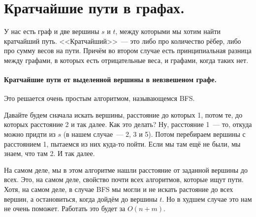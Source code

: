 \documentclass{article}
\begin{document}
    \section{Кратчайшие пути в графах.}
    У нас есть граф и две вершины $s$ и $t$, между которыми мы хотим найти кратчайший путь. <<Кратчайший>>~--- это либо про количество рёбер, либо про сумму весов на пути. Причём во втором случае есть принципиальная разница между графами, в которых есть отрицательные веса, и графами, когда таких нет.
    \paragraph{Кратчайшие пути от выделенной вершины в невзвешеном графе.}
    Это решается очень простым алгоритмом, называющемся BFS.
    \begin{figure}[H]
    \end{figure}\noindent
    Давайте будем сначала искать вершины, расстояние до которых 1, потом те, до которых расстояние 2 и так далее. Как это делать? Ну, расстояние 1~--- то, откуда можно придти из $s$ (в нашем случае~--- 2, 3 и 5). Потом перебираем вершины с расстоянием 1, пытаемся из них куда-то пойти. Если мы там ещё не были, мы знаем, что там 2. И так далее.
    \begin{figure}[H]
    \end{figure}\noindent
    На самом деле, мы в этом алгоритме нашли расстояние от заданной вершины до всех. Это, на самом деле, свойство почти всех алгоритмов, которые ищут пути. Хотя, на самом деле, в случае BFS мы могли и не искать растояние до всех вершин, а остановиться, когда дойдём до вершины $t$. Но в худшем случае это нам не очень поможет. Работать это будет за $O(n+m)$.\\
\end{document}
